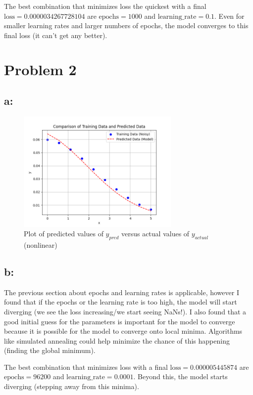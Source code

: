 \documentclass[letterpaper, 10 pt, conference]{ieeeconf}  %
\begin{document}
The best combination that minimizes loss the quickest with a final $\text{loss} = 0.0000034267728104$ are $\text{epochs} = 1000$ and $\text{learning\_rate} = 0.1$. Even for smaller learning rates and larger numbers of epochs, the model converges to this final loss (it can't get any better). 


\clearpage

\section*{Problem 2}
\subsection*{a:}
\begin{figure}[!ht]
        \centering
        \includegraphics[width=0.7\textwidth,keepaspectratio]{nonlinear_fit.png}
        \caption{Plot of predicted values of $y_{pred}$ versus actual values of $y_{actual}$ (nonlinear)}
        \label{fig:nonlinear_fit}
\end{figure}
\subsection*{b:}
The previous section about epochs and learning rates is applicable, however I found that if the epochs or the learning rate is too high, the model will start diverging (we see the loss increasing/we start seeing NaNs!). I also found that a good initial guess for the parameters is important for the model to converge because it is possible for the model to converge onto local minima. Algorithms like simulated annealing could help minimize the chance of this happening (finding the global minimum).

The best combination that minimizes loss with a final $\text{loss} = 0.000005445874$ are $\text{epochs} = 96200$ and $\text{learning\_rate} = 0.0001$. Beyond this, the model starts diverging (stepping away from this minima).
\end{document}

